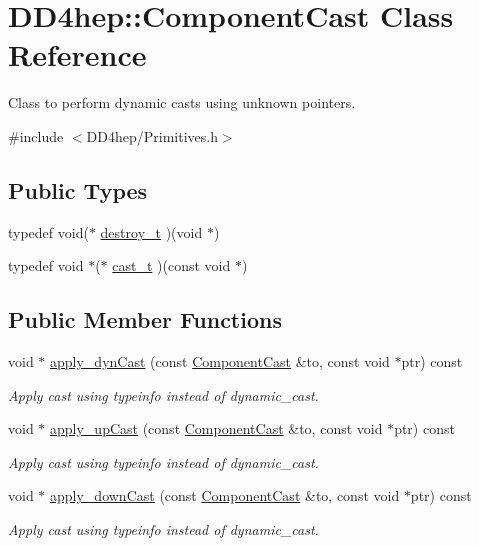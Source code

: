 \hypertarget{class_d_d4hep_1_1_component_cast}{
\section{DD4hep::ComponentCast Class Reference}
\label{class_d_d4hep_1_1_component_cast}
}


Class to perform dynamic casts using unknown pointers.  


{\ttfamily \#include $<$DD4hep/Primitives.h$>$}\subsection*{Public Types}
\begin{DoxyCompactItemize}
\item 
typedef void($\ast$ \hyperlink{class_d_d4hep_1_1_component_cast_a60cfc51ff4c1b324e86c3f6b4bf4ba55}{destroy\_\-t} )(void $\ast$)
\item 
typedef void $\ast$($\ast$ \hyperlink{class_d_d4hep_1_1_component_cast_a8d1ee595a10ab3382d1c7dc1b8987c1f}{cast\_\-t} )(const void $\ast$)
\end{DoxyCompactItemize}
\subsection*{Public Member Functions}
\begin{DoxyCompactItemize}
\item 
void $\ast$ \hyperlink{class_d_d4hep_1_1_component_cast_aace12e8cef1815233b06c108f0d85082}{apply\_\-dynCast} (const \hyperlink{class_d_d4hep_1_1_component_cast}{ComponentCast} \&to, const void $\ast$ptr) const 
\begin{DoxyCompactList}\small\item\em Apply cast using typeinfo instead of dynamic\_\-cast. \item\end{DoxyCompactList}\item 
void $\ast$ \hyperlink{class_d_d4hep_1_1_component_cast_a07a0c4c9fe6a3d703602df77211ce37e}{apply\_\-upCast} (const \hyperlink{class_d_d4hep_1_1_component_cast}{ComponentCast} \&to, const void $\ast$ptr) const 
\begin{DoxyCompactList}\small\item\em Apply cast using typeinfo instead of dynamic\_\-cast. \item\end{DoxyCompactList}\item 
void $\ast$ \hyperlink{class_d_d4hep_1_1_component_cast_abf0cc9ff379a6dfb09f95c2a6c3c9fb7}{apply\_\-downCast} (const \hyperlink{class_d_d4hep_1_1_component_cast}{ComponentCast} \&to, const void $\ast$ptr) const 
\begin{DoxyCompactList}\small\item\em Apply cast using typeinfo instead of dynamic\_\-cast. \item\end{DoxyCompactList}\end{DoxyCompactItemize}
